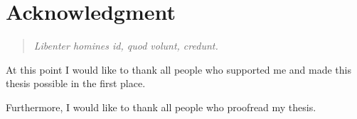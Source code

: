 





\begingroup
\let\clearpage\relax
\let\cleardoublepage\relax
\let\cleardoublepage\relax
\chapter*{Acknowledgment}

  \begin{verse}
    \textit{Libenter homines id, quod volunt, credunt.}\\
  \end{verse}

\hspace{3cm}

At this point I would like to thank all people who supported me and made this thesis possible 
in the first place.

Furthermore, I would like to thank all people who proofread my thesis.


\endgroup



